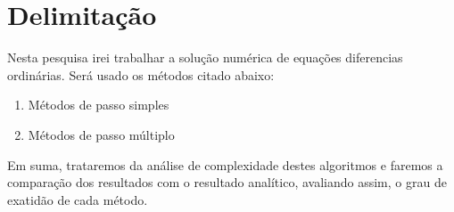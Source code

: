 \section{Delimitação}\label{ldelimitacao}

Nesta pesquisa irei trabalhar a solução numérica de equações diferencias
ordinárias. Será usado os métodos citado abaixo:
\begin{enumerate}[label=\roman*.]
\item Métodos de passo simples
\item Métodos de passo múltiplo
\end{enumerate}

Em suma, trataremos da análise de complexidade destes algoritmos e faremos a 
comparação dos resultados com o resultado analítico, avaliando assim, o 
grau de exatidão de cada método.


